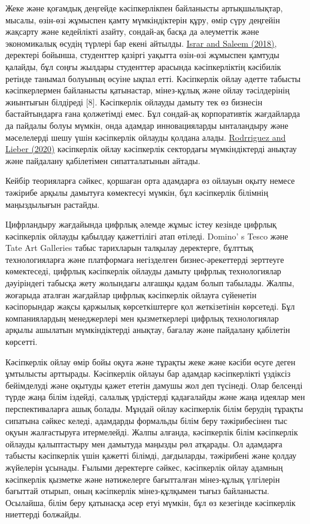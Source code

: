 Жеке және қоғамдық деңгейде кәсіпкерлікпен байланысты артықшылықтар,
мысалы, өзін-өзі жұмыспен қамту мүмкіндіктерін құру, өмір сүру деңгейін
жақсарту және кедейлікті азайту, сондай-ақ басқа да әлеуметтік және
экономикалық өсудің түрлері бар екені айтылды.
\href{https://www.frontiersin.org/articles/10.3389/fpsyg.2023.1240910/full\#ref31}{Israr
and Saleem (2018)}, деректері бойынша, студенттер қазіргі уақытта
өзін-өзі жұмыспен қамтуды қалайды, бұл соңғы жылдары студенттер арасында
кәсіпкерліктің кәсібилік ретінде танымал болуының өсуіне ықпал етті.
Кәсіпкерлік ойлау әдетте табысты кәсіпкерлермен байланысты қатынастар,
мінез-құлық және ойлау тәсілдерінің жиынтығын білдіреді {[}8{]}.
Кәсіпкерлік ойлауды дамыту тек өз бизнесін бастайтындарға ғана
қолжетімді емес. Бұл сондай-ақ корпоративтік жағдайларда да пайдалы
болуы мүмкін, онда адамдар инновацияларды ынталандыру және мәселелерді
шешу үшін кәсіпкерлік ойлауды қолдана алады.
\href{https://www.frontiersin.org/articles/10.3389/fpsyg.2023.1240910/full\#ref51}{Rodrriguez
and Lieber (2020)} кәсіпкерлік ойлау кәсіпкерлік сектордағы
мүмкіндіктерді анықтау және пайдалану қабілетімен сипатталатынын айтады.

Кейбір теорияларға сәйкес, қоршаған орта адамдарға өз ойлауын оқыту
немесе тәжірибе арқылы дамытуға көмектесуі мүмкін, бұл кәсіпкерлік
білімнің маңыздылығын растайды.

Цифрландыру жағдайында цифрлық әлемде жұмыс істеу кезінде цифрлық
кәсіпкерлік ойлауды қабылдау қажеттілігі атап өтіледі.
Domino' s Tesco және Tate Art Galleries табыс тарихларын
талқылау деректерге, бұлттық технологияларға және платформаға
негізделген бизнес-әрекеттерді зерттеуге көмектеседі, цифрлық
кәсіпкерлік ойлауды дамыту цифрлық технологиялар дәуіріндегі табысқа
жету жолындағы алғашқы қадам болып табылады. Жалпы, жоғарыда аталған
жағдайлар цифрлық кәсіпкерлік ойлауға сүйенетін кәсіпорындар жақсы
қаржылық көрсеткіштерге қол жеткізетінін көрсетеді. Бұл компаниялардың
менеджерлері мен қызметкерлері цифрлық технологиялар арқылы ашылатын
мүмкіндіктерді анықтау, бағалау және пайдалану қабілетін көрсетті.

Кәсіпкерлік ойлау өмір бойы оқуға және тұрақты жеке және кәсіби өсуге
деген ұмтылысты арттырады. Кәсіпкерлік ойлауы бар адамдар кәсіпкерлікті
үздіксіз бейімделуді және оқытуды қажет ететін дамушы жол деп түсінеді.
Олар белсенді түрде жаңа білім іздейді, салалық үрдістерді қадағалайды
және жаңа идеялар мен перспективаларға ашық болады. Мұндай ойлау
кәсіпкерлік білім берудің тұрақты сипатына сәйкес келеді, адамдарды
формальды білім беру тәжірибесінен тыс оқуын жалғастыруға итермелейді.
Жалпы алғанда, кәсіпкерлік білім кәсіпкерлік ойлауды қалыптастыру мен
дамытуда маңызды рөл атқарады. Ол адамдарға табысты кәсіпкерлік үшін
қажетті білімді, дағдыларды, тәжірибені және қолдау жүйелерін ұсынады.
Ғылыми деректерге сәйкес, кәсіпкерлік ойлау адамның кәсіпкерлік қызметке
және нәтижелерге бағытталған мінез-құлық үлгілерін бағыттай отырып, оның
кәсіпкерлік мінез-құлқымен тығыз байланысты. Осылайша, білім беру
қатынасқа әсер етуі мүмкін, бұл өз кезегінде кәсіпкерлік ниеттерді
болжайды.

